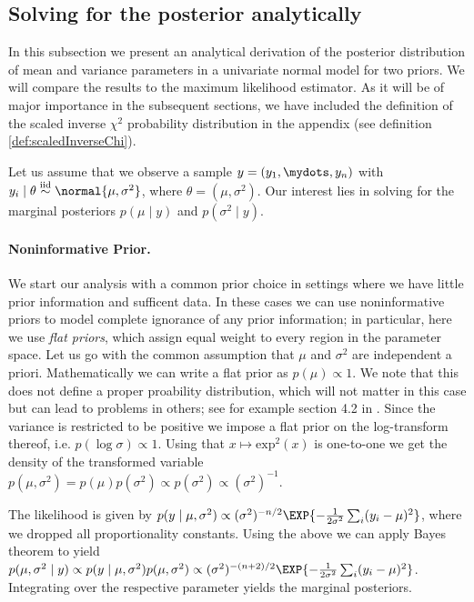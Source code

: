 \subsection{Solving for the posterior analytically}
In this subsection we present an analytical derivation of the posterior distribution of mean and variance parameters in a univariate normal model for two priors.
We will compare the results to the maximum likelihood estimator.
As it will be of major importance in the subsequent sections, we have included the definition of the scaled inverse $\chi^2$ probability distribution in the appendix (see definition \ref{def:scaledInverseChi}).

Let us assume that we observe a sample $y = (y_1, \mydots, y_n)$
with $y_i \mid \theta \overset{\text{iid}}{\sim} \normal{\mu, \sigma^2}$, where $\theta = (\mu, \sigma^2)$.
Our interest lies in solving for the marginal posteriors $p(\mu \mid y)$ and $p(\sigma^2 \mid y)$.

\paragraph{Noninformative Prior.}
We start our analysis with a common prior choice in settings where we have little prior information and sufficent data.
In these cases we can use noninformative priors to model complete ignorance of any prior information; in particular, here we use \emph{flat priors}, which assign equal weight to every region in the parameter space.
Let us go with the common assumption that $\mu$ and $\sigma^2$ are independent a priori.
Mathematically we can write a flat prior as $p(\mu) \propto 1$.
We note that this does not define a proper proability distribution, which will not matter in this case but can lead to problems in others; see for example section 4.2 in \citet{kass1996}.
Since the variance is restricted to be positive we impose a flat prior on the log-transform thereof, i.e. $p(\log \sigma) \propto 1$.
Using that $x \mapsto \text{exp}^2(x)$ is one-to-one we get the density of the transformed variable $p(\mu, \sigma^2) = p(\mu)p(\sigma^2) \propto p(\sigma^2) \propto (\sigma^2)^{-1}$.

The likelihood is given by $p(y \mid \mu, \sigma^2) \propto (\sigma^2)^{-n/2} \EXP{-\frac{1}{2\sigma^2}\sum_i (y_i - \mu)^2}$, where we dropped all proportionality constants.
Using the above we can apply Bayes theorem to yield $p(\mu, \sigma^2 \mid y) \propto p(y \mid \mu, \sigma^2) p(\mu, \sigma^2) \propto (\sigma^2)^{-(n+2)/2} \EXP{-\frac{1}{2\sigma^2}\sum_i (y_i - \mu)^2}$.
Integrating over the respective parameter yields the marginal posteriors.

